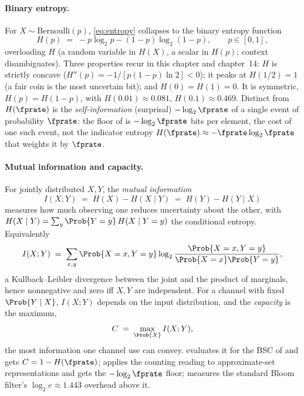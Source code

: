 \paragraph{Binary entropy.}
For $X \sim \mathrm{Bernoulli}(p)$, \eqref{eq:entropy} collapses to the
binary entropy function
\begin{equation}
\label{eq:binary-entropy}
  H(p) \;=\; -p \log_2 p - (1 - p)\log_2(1 - p), \qquad p \in [0, 1],
\end{equation}
overloading $H$ (a random variable in $H(X)$, a scalar in $H(p)$; context
disambiguates). Three properties recur in this chapter and chapter~14: $H$ is
strictly concave ($H''(p) = -1/[p(1-p)\ln 2] < 0$); it peaks at $H(1/2) = 1$
(a fair coin is the most uncertain bit); and $H(0) = H(1) = 0$. It is
symmetric, $H(p) = H(1-p)$, with $H(0.01) \approx 0.081$, $H(0.1) \approx
0.469$. Distinct from $H(\fprate)$ is the \emph{self-information} (surprisal)
$-\log_2 \fprate$ of a single event of probability $\fprate$: the floor of
 is $-\log_2 \fprate$ bits per element, the cost of one
such event, not the indicator entropy $H(\fprate) \approx -\fprate \log_2
\fprate$ that weights it by $\fprate$.

\paragraph{Mutual information and capacity.}
For jointly distributed $X, Y$, the \emph{mutual information}
\begin{equation}
\label{eq:mutual-info}
  I(X; Y) \;=\; H(X) - H(X \mid Y) \;=\; H(Y) - H(Y \mid X)
\end{equation}
measures how much observing one reduces uncertainty about the other, with
$H(X \mid Y) = \sum_y \Prob{Y = y}\,H(X \mid Y = y)$ the conditional entropy.
Equivalently
\begin{equation}
\label{eq:mutual-info-joint}
  I(X; Y) \;=\; \sum_{x, y} \Prob{X = x, Y = y}
    \log_2 \frac{\Prob{X = x, Y = y}}{\Prob{X = x}\Prob{Y = y}},
\end{equation}
a Kullback--Leibler divergence between the joint and the product of marginals,
hence nonnegative and zero iff $X, Y$ are independent. For a channel with fixed
$\Prob{Y \mid X}$, $I(X; Y)$ depends on the input distribution, and the
\emph{capacity} is the maximum,
\begin{equation}
\label{eq:capacity-def}
  C \;=\; \max_{\Prob{X}} I(X; Y),
\end{equation}
the most information one channel use can convey. 
evaluates it for the BSC of  and gets $C = 1 - H(\fprate)$;
 applies the counting reading to approximate-set
representations and gets the $-\log_2 \fprate$ floor;
 measures the standard Bloom filter's $\log_2 e \approx
1.443$ overhead above it.

